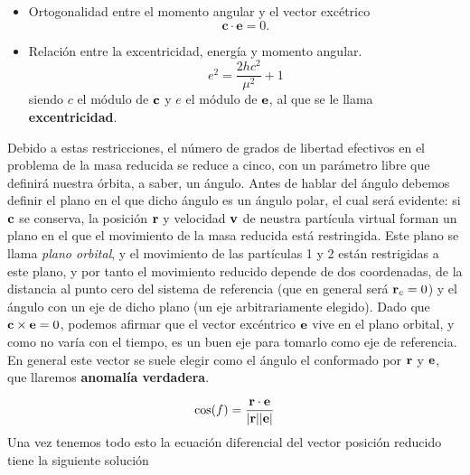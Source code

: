 \begin{itemize}
	\item Ortogonalidad entre el momento angular y el vector excétrico
	      \begin{equation}
		      \mathbf{c} \cdot \mathbf{e} = 0.
	      \end{equation}

	\item Relación entre la excentricidad, energía y momento angular.
	      \begin{equation}
		      e^2 = \frac{2hc^2}{\mu^2} + 1
	      \end{equation}
	      siendo $c$ el módulo de $\mathbf{c}$ y $e$ el módulo de $\mathbf{e}$, al que se le llama \textbf{excentricidad}.
\end{itemize}
Debido a estas restricciones, el número de grados de libertad efectivos en el problema de la masa reducida se reduce a cinco, con un parámetro libre que definirá nuestra órbita, a saber, un ángulo. Antes de hablar del ángulo debemos definir el plano en el que dicho ángulo es un ángulo polar, el cual será evidente: si $\mathbf{c}$ se conserva, la posición $\mathbf{r}$ y velocidad $\mathbf{v}$ de neustra partícula virtual forman un plano en el que el movimiento de la masa reducida está restringida. Este plano se llama \textit{plano orbital}, y el movimiento de las partículas 1 y 2 están restrigidas a este plano, y por tanto el movimiento reducido depende de dos coordenadas, de la distancia al punto cero del sistema de referencia (que en general será $\mathbf{r}_c=0$) y el ángulo con un eje de dicho plano (un eje arbitrariamente elegido). Dado que $\mathbf{c} \times \mathbf{e} = 0$, podemos afirmar que el vector excéntrico $\mathbf{e}$ vive en el plano orbital, y como no varía con el tiempo, es un buen eje para tomarlo como eje de referencia. En general este vector se suele elegir como el ángulo el conformado por $\mathbf{r}$ y $\mathbf{e}$, que llaremos \textbf{anomalía verdadera}.

\begin{equation}
	\cos (f) = \frac{\mathbf{r} \cdot \mathbf{e}}{|\mathbf{r}||\mathbf{e}|}
\end{equation}
Una vez tenemos todo esto la ecuación diferencial del vector posición reducido tiene la siguiente solución

